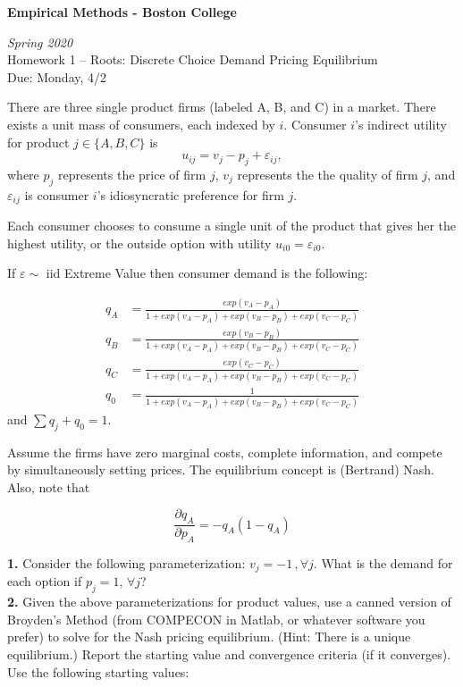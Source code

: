 \documentclass[10pt]{article}
\begin{document}
\begin{center}
\textbf{Empirical Methods - Boston College}

\emph{Spring 2020}\\[1em]

Homework 1 -- Roots: Discrete Choice Demand Pricing Equilibrium\\[1em]
Due: Monday, 4/2
\end{center}

There are three single product firms (labeled A, B, and C) in a market. There exists a unit mass of consumers, each indexed by $i$. Consumer $i$'s indirect utility for product $j\in\{A,B,C\}$ is
$$u_{ij} = v_j - p_j + \varepsilon_{ij},$$
where $p_j$ represents the price of firm $j$, $v_j$ represents the the quality of firm $j$, and $\varepsilon_{ij}$ is consumer $i$'s idiosyncratic preference for firm $j$.  

Each consumer chooses to consume a single unit of the product that gives her the highest utility, or the outside option with utility $u_{i0} = \varepsilon_{i0}$.

If $\varepsilon\sim$ iid Extreme Value then consumer demand is the following:

\begin{align*}
q_A &= \frac{exp(v_A - p_A)}{1 + exp(v_A - p_A) + exp(v_B - p_B) + exp(v_C - p_C)} \\
q_B &= \frac{exp(v_B - p_B)}{1 + exp(v_A - p_A) + exp(v_B - p_B) + exp(v_C - p_C)} \\
q_C &= \frac{exp(v_C - p_C)}{1 + exp(v_A - p_A) + exp(v_B - p_B) + exp(v_C - p_C)} \\
q_0 &= \frac{1}{1 + exp(v_A - p_A) + exp(v_B - p_B) + exp(v_C - p_C)} 
\end{align*} 
and $\sum q_j + q_0 = 1$.

Assume the firms have zero marginal costs, complete information, and compete by simultaneously setting prices. The equilibrium concept is (Bertrand) Nash. Also, note that 

$$\frac{\partial q_A}{\partial p_A} = -q_A(1-q_A)$$

\vspace{2em}

\noindent
\textbf{1.} Consider the following parameterization: $v_j=-1\,,\forall j$. What is the demand for each option if $p_j=1,\,\forall j$?\\[2em]

\noindent
\textbf{2.}
Given the above parameterizations for product values, use a canned version of Broyden's Method (from COMPECON in Matlab, or whatever software you prefer) to solve for the Nash pricing equilibrium. (Hint: There is a unique equilibrium.) Report the starting value and convergence criteria (if it converges). Use the following starting values:
\end{document}
